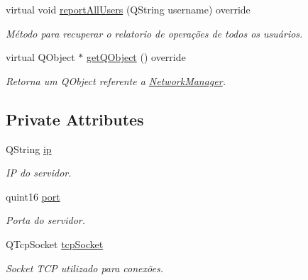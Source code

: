 \begin{DoxyCompactItemize}
virtual void \hyperlink{classNetworkManagerImpl_a2131e26c9804d50c6e1ab6d5b7ccec94}{report\+All\+Users} (Q\+String username) override
\begin{DoxyCompactList}\small\item\em Método para recuperar o relatorio de operações de todos os usuários. \end{DoxyCompactList}\item 
virtual Q\+Object $\ast$ \hyperlink{classNetworkManagerImpl_a3340057281dadf1861d94d8aba9e976e}{get\+Q\+Object} () override
\begin{DoxyCompactList}\small\item\em Retorna um Q\+Object referente a \hyperlink{classNetworkManager}{Network\+Manager}. \end{DoxyCompactList}\end{DoxyCompactItemize}
\subsection*{Private Attributes}
\begin{DoxyCompactItemize}
\item 
Q\+String \hyperlink{classNetworkManagerImpl_ac5d5c68c8000d8afef7632259e19f788}{ip}\hypertarget{classNetworkManagerImpl_ac5d5c68c8000d8afef7632259e19f788}{}\label{classNetworkManagerImpl_ac5d5c68c8000d8afef7632259e19f788}

\begin{DoxyCompactList}\small\item\em IP do servidor. \end{DoxyCompactList}\item 
quint16 \hyperlink{classNetworkManagerImpl_a4723f928e10d6d90987ff673b36c434d}{port}\hypertarget{classNetworkManagerImpl_a4723f928e10d6d90987ff673b36c434d}{}\label{classNetworkManagerImpl_a4723f928e10d6d90987ff673b36c434d}

\begin{DoxyCompactList}\small\item\em Porta do servidor. \end{DoxyCompactList}\item 
Q\+Tcp\+Socket \hyperlink{classNetworkManagerImpl_a5b0a29db0e48c67051ec36235b1df570}{tcp\+Socket}\hypertarget{classNetworkManagerImpl_a5b0a29db0e48c67051ec36235b1df570}{}\label{classNetworkManagerImpl_a5b0a29db0e48c67051ec36235b1df570}

\begin{DoxyCompactList}\small\item\em Socket T\+CP utilizado para conexões. \end{DoxyCompactList}\end{DoxyCompactItemize}
